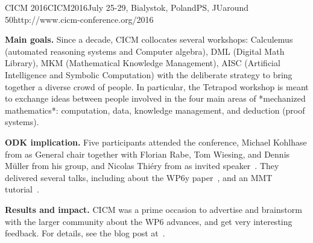 \begin{event}{CICM 2016}{CICM2016}{July 25-29, Bialystok, Poland}{PS, JU}{around 50}{http://www.cicm-conference.org/2016}

\textbf{Main goals.} Since a decade, CICM collocates several workshops: Calculemus
(automated reasoning systems and Computer algebra), DML (Digital Math
Library), MKM (Mathematical Knowledge Management), AISC (Artificial
Intelligence and Symbolic Computation) with the deliberate strategy to
bring together a diverse crowd of people. In particular, the Tetrapod
workshop is meant to exchange ideas between people involved in the
four main areas of *mechanized mathematics*: computation, data,
knowledge management, and deduction (proof systems).

\textbf{ODK implication.} Five \ODK participants attended the conference, Michael Kohlhase
from  as General chair together with Florian Rabe, Tom Wiesing, and Dennis Müller
from his group, and Nicolas Thiéry from  as invited
speaker~\cite{Thierry:igcscac16}. They delivered several talks, including about the WP6y
paper~\cite{DehKohKon:iop16}, and an MMT tutorial~\cite{RabIanMue:ldm16,RabIanMue:adm16}.

\textbf{Results and impact.} CICM was a prime occasion to advertise and brainstorm with
the larger community about the WP6 advances, and get very interesting feedback. For
details, see the blog post at~\cite{Thiery:pdc16}.
\end{event}


